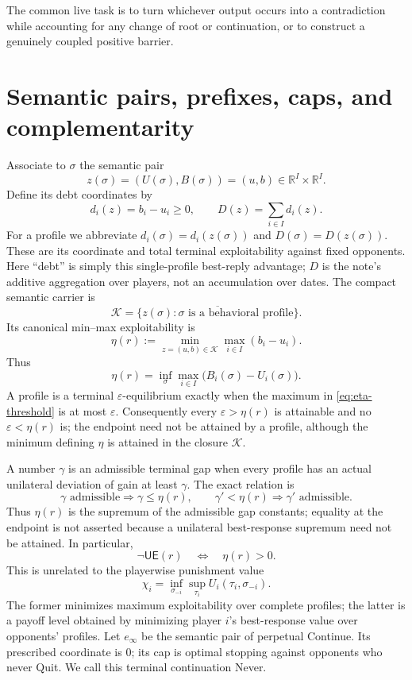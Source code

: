 \documentclass[11pt]{article}
\newcommand{\R}{\mathbb R}
\newcommand{\K}{\mathcal K}
\newcommand{\UE}{\mathsf{UE}}
\begin{document}
The common live task is to turn whichever output occurs into a contradiction
while accounting for any change of root or continuation, or to construct a
genuinely coupled positive barrier.

\section{Semantic pairs, prefixes, caps, and complementarity}
\label{sec:semantics}

Associate to $\sigma$ the semantic pair
\[
 z(\sigma)=(U(\sigma),B(\sigma))=(u,b)\in\R^I\times\R^I.
\]
Define its debt coordinates by
\[
 d_i(z)=b_i-u_i\ge0,
 \qquad D(z)=\sum_{i\in I}d_i(z).
\]
For a profile we abbreviate $d_i(\sigma)=d_i(z(\sigma))$ and
$D(\sigma)=D(z(\sigma))$.  These are its coordinate and total terminal
exploitability against fixed opponents.  Here ``debt'' is simply this
single-profile best-reply advantage; $D$ is the note's additive aggregation
over players, not an accumulation over dates.
The compact semantic carrier is
\[
 \K=\overline{\{z(\sigma):\sigma\text{ is a behavioral profile}\}}.
\]
Its canonical min--max exploitability is
\[
 \eta(r):=\min_{z=(u,b)\in\K}\max_{i\in I}(b_i-u_i).
\]
Thus
\begin{equation}
\label{eq:eta-threshold}
 \eta(r)=\inf_\sigma\max_{i\in I}
       \bigl(B_i(\sigma)-U_i(\sigma)\bigr).
\end{equation}
A profile is a terminal $\varepsilon$-equilibrium exactly when the maximum
in \eqref{eq:eta-threshold} is at most $\varepsilon$.  Consequently every
$\varepsilon>\eta(r)$ is attainable and no $\varepsilon<\eta(r)$ is; the
endpoint need not be attained by a profile, although the minimum defining
$\eta$ is attained in the closure $\K$.

A number $\gamma$ is an admissible terminal gap
when every profile has an actual unilateral deviation of gain at least
$\gamma$.  The exact relation is
\[
 \gamma\text{ admissible}\Longrightarrow\gamma\le\eta(r),
 \qquad
 \gamma'<\eta(r)\Longrightarrow\gamma'\text{ admissible}.
\]
Thus $\eta(r)$ is the supremum of the admissible gap constants; equality at
the endpoint is not asserted because a unilateral best-response supremum
need not be attained.  In particular,
\[
 \neg\UE(r)\quad\Longleftrightarrow\quad\eta(r)>0.
\]
This is unrelated to the playerwise punishment value
\[
 \chi_i=\inf_{\sigma_{-i}}\sup_{\tau_i}U_i(\tau_i,\sigma_{-i}).
\]
The former minimizes maximum exploitability over complete profiles; the
latter is a payoff level obtained by minimizing player $i$'s best-response
value over opponents' profiles.
Let $e_\infty$ be the semantic pair of perpetual Continue.  Its prescribed
coordinate is $0$; its cap is optimal stopping against opponents who never
Quit.  We call this terminal continuation Never.
\end{document}
